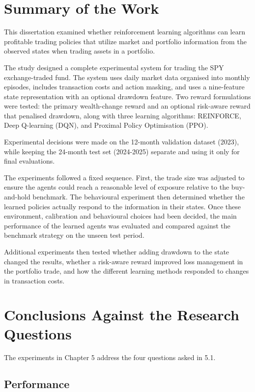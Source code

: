\section{Summary of the Work}

This dissertation examined whether reinforcement learning algorithms can
learn profitable trading policies that utilize market and portfolio
information from the observed states when trading assets in a portfolio.

The study designed a complete experimental system for trading the SPY
exchange-traded fund. The system uses daily market data organised into
monthly episodes, includes transaction costs and action masking, and
uses a nine-feature state representation with an optional drawdown
feature. Two reward formulations were tested: the primary wealth-change
reward and an optional risk-aware reward that penalised drawdown, along
with three learning algorithms: REINFORCE, Deep Q-learning (DQN), and
Proximal Policy Optimisation (PPO).

Experimental decisions were made on the 12-month validation dataset
(2023), while keeping the 24-month test set (2024-2025) separate and
using it only for final evaluations.

The experiments followed a fixed sequence. First, the trade size was
adjusted to ensure the agents could reach a reasonable level of exposure
relative to the buy-and-hold benchmark. The behavioural experiment then
determined whether the learned policies actually respond to the
information in their states. Once these environment, calibration and
behavioural choices had been decided, the main performance of the
learned agents was evaluated and compared against the benchmark strategy
on the unseen test period.

Additional experiments then tested whether adding drawdown to the state
changed the results, whether a risk-aware reward improved loss
management in the portfolio trade, and how the different learning
methods responded to changes in transaction costs.

\section{Conclusions Against the Research Questions}

The experiments in Chapter 5 address the four questions asked in 5.1.

\subsection{Performance}

